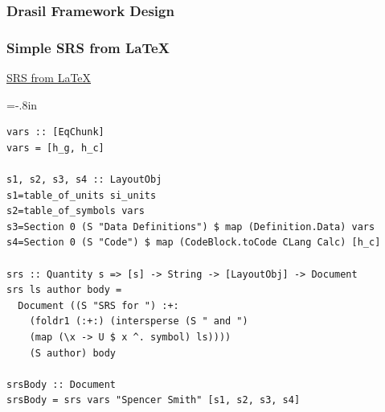 \documentclass{beamer}
\begin{document}
\begin{frame}

\frametitle{Drasil Framework Design}

\begin{center}
\end{center}

\end{frame}


\begin{frame}[fragile]

\frametitle{Simple SRS from LaTeX}

\href{run:SRS.pdf}{SRS from LaTeX}

\end{frame}


\hoffset=-.8in %

\begin{frame}


\begin{lstlisting}[frame=none, 
  showstringspaces=false, basicstyle=\footnotesize]
vars :: [EqChunk]
vars = [h_g, h_c]

s1, s2, s3, s4 :: LayoutObj
s1=table_of_units si_units
s2=table_of_symbols vars
s3=Section 0 (S "Data Definitions") $ map (Definition.Data) vars
s4=Section 0 (S "Code") $ map (CodeBlock.toCode CLang Calc) [h_c]

srs :: Quantity s => [s] -> String -> [LayoutObj] -> Document
srs ls author body =
  Document ((S "SRS for ") :+: 
    (foldr1 (:+:) (intersperse (S " and ") 
    (map (\x -> U $ x ^. symbol) ls))))
    (S author) body  
  
srsBody :: Document
srsBody = srs vars "Spencer Smith" [s1, s2, s3, s4]
\end{lstlisting}
\end{frame}
\end{document}
